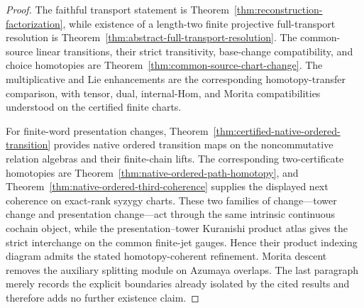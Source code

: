 \documentclass[11pt]{article}
\theoremstyle{definition}
\begin{document}
\begin{proof}
The faithful transport statement is
Theorem~\ref{thm:reconstruction-factorization}, while existence of a length-two
finite projective full-transport resolution is
Theorem~\ref{thm:abstract-full-transport-resolution}.  The common-source
linear transitions, their strict transitivity, base-change compatibility, and
choice homotopies are Theorem~\ref{thm:common-source-chart-change}.  The
multiplicative and Lie enhancements are
the corresponding homotopy-transfer comparison, with tensor, dual, internal-Hom, and Morita compatibilities understood on the certified finite charts.

For finite-word presentation changes, Theorem~\ref{thm:certified-native-ordered-transition}
provides native ordered transition maps on the noncommutative relation
algebras and their finite-chain lifts.  The corresponding two-certificate
homotopies are Theorem~\ref{thm:native-ordered-path-homotopy}, and
Theorem~\ref{thm:native-ordered-third-coherence} supplies the displayed next
coherence on exact-rank syzygy charts.  These two families of change---tower
change and presentation change---act through the same intrinsic continuous
cochain object, while the presentation--tower Kuranishi product atlas gives
the strict interchange on the common finite-jet gauges.  Hence their product
indexing diagram admits the stated homotopy-coherent refinement.  Morita
descent removes the auxiliary splitting module on Azumaya overlaps.  The last
paragraph merely records the explicit boundaries already isolated by the
cited results and therefore adds no further existence claim.
\end{proof}
\end{document}
